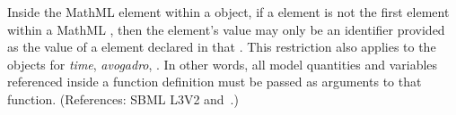 Inside the  MathML element within a \FunctionDefinition
object, if a  element is not the first element within a MathML
, then the  element's value may only be an
identifier provided as the value of a  element declared in that
.  This restriction also applies to the 
objects for \emph{time}, \emph{avogadro}, .  In other words, all model
quantities and variables referenced inside a function definition must be
passed as arguments to that function.  (References: SBML L3V2
 and~.)
